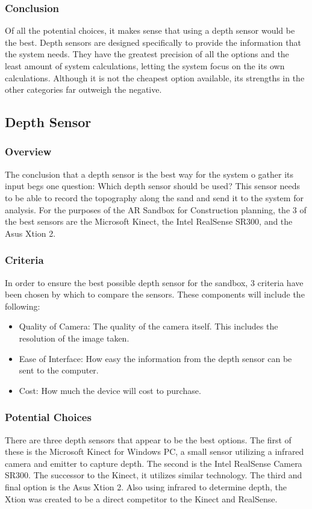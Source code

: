 
\subsubsection{Conclusion}
Of all the potential choices, it makes sense that using a depth sensor would be the best.
Depth sensors are designed specifically to provide the information that the system needs.
They have the greatest precision of all the options and the least amount of system calculations, letting the system focus on the its own calculations.
Although it is not the cheapest option available, its strengths in the other categories far outweigh the negative. 

\subsection{Depth Sensor}
\subsubsection{Overview}
The conclusion that a depth sensor is the best way for the system o gather its input begs one question: Which depth sensor should be used?
This sensor needs to be able to record the topography along the sand and send it to the system for analysis.
For the purposes of the AR Sandbox for Construction planning, the 3 of the best sensors are the Microsoft Kinect, the Intel RealSense SR300, and the Asus Xtion 2.
\subsubsection{Criteria}
In order to ensure the best possible depth sensor for the sandbox, 3 criteria have been chosen by which to compare the sensors.
These components will include the following:
\begin{itemize}
\item Quality of Camera: The quality of the camera itself.  This includes the resolution of the image taken.
\item Ease of Interface: How easy the information from the depth sensor can be sent to the computer.
\item Cost: How much the device will cost to purchase.
\end{itemize}
\subsubsection{Potential Choices}
There are three depth sensors that appear to be the best options.
The first of these is the Microsoft Kinect for Windows PC, a small sensor utilizing a infrared camera and emitter to capture depth.
The second is the Intel RealSense Camera SR300.  
The successor to the Kinect, it utilizes similar technology.
The third and final option is the Asus Xtion 2. Also using infrared to determine depth, the Xtion was created to be a direct competitor to the Kinect and RealSense.

